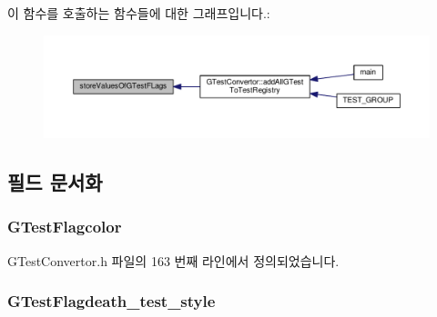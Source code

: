 이 함수를 호출하는 함수들에 대한 그래프입니다.\+:
\nopagebreak
\begin{figure}[H]
\begin{center}
\leavevmode
\includegraphics[width=350pt]{class_g_test_flags_that_allocate_memory_abeb18e623ac60095ec42f4d94d43cc8a_icgraph}
\end{center}
\end{figure}




\subsection{필드 문서화}
\subsubsection[{\texorpdfstring{G\+Test\+Flagcolor}{GTestFlagcolor}}]{ G\+Test\+Flagcolor\hspace{0.3cm}{\ttfamily [private]}}\hypertarget{class_g_test_flags_that_allocate_memory_a6936931985c04bd6689616bcf4549433}{}\label{class_g_test_flags_that_allocate_memory_a6936931985c04bd6689616bcf4549433}


G\+Test\+Convertor.\+h 파일의 163 번째 라인에서 정의되었습니다.

\subsubsection[{\texorpdfstring{G\+Test\+Flagdeath\+\_\+test\+\_\+style}{GTestFlagdeath_test_style}}]{ G\+Test\+Flagdeath\+\_\+test\+\_\+style\hspace{0.3cm}{\ttfamily [private]}}\hypertarget{class_g_test_flags_that_allocate_memory_a247f73cf721bebea64d826b282a6cbd6}{}\label{class_g_test_flags_that_allocate_memory_a247f73cf721bebea64d826b282a6cbd6}


